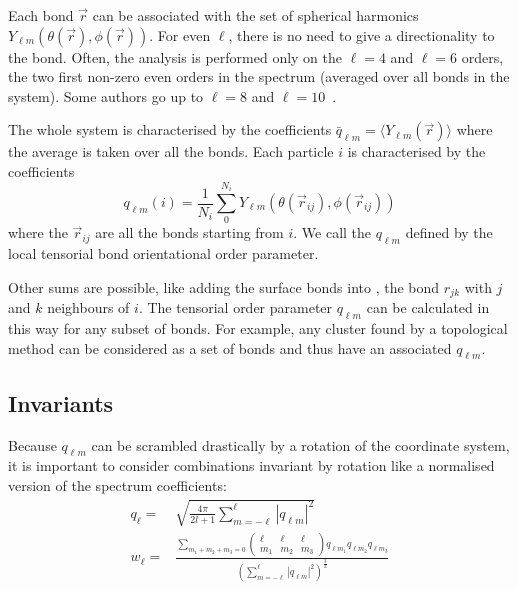 Each bond $\vec r$ can be associated with the set of spherical harmonics $Y_{\ell m}(\theta(\vec r),\phi(\vec r))$. For even $\ell$, there is no need to give a directionality to the bond. Often, the analysis is performed only on the $\ell=4$ and $\ell=6$ orders, the two first non-zero even orders in the spectrum (averaged over all bonds in the system). Some authors go up to $\ell=8$ and $\ell=10$~\citep{Chakravarty2002}.

The whole system is characterised by the coefficients $\bar{q}_{\ell m} = \langle Y_{\ell m}(\vec r) \rangle$ where the average is taken over all the bonds. Each particle $i$ is characterised by the coefficients
\begin{equation}
	q_{\ell m}(i) = \frac{1}{N_i}\sum_{0}^{N_i} Y_{\ell m}(\theta(\vec r_{ij}),\phi(\vec r_{ij}))
	\label{eq:qlm}
\end{equation}
where the $\vec{r}_{ij}$ are all the bonds starting from $i$. We call the $q_{\ell m}$ defined by  the local tensorial bond orientational order parameter.

Other sums are possible, like adding the surface bonds into ,  the bond $r_{jk}$ with $j$ and $k$ neighbours of $i$. The tensorial order parameter $q_{\ell m}$ can be calculated in this way for any subset of bonds. For example, any cluster found by a topological method can be considered as a set of bonds and thus have an associated $q_{\ell m}$.

\subsection{Invariants}
\label{sec:boo_invariants}
Because $q_{\ell m}$ can be scrambled drastically by a rotation of the coordinate system, it is important to consider combinations invariant by rotation like a normalised version of the spectrum coefficients:
\begin{align}
	q_\ell =& \sqrt{\frac{4\pi}{2l+1} \sum_{m=-\ell}^{\ell} |q_{\ell m}|^2 }\label{eq:ql}\\
	w_\ell =& \frac{
		\sum\limits_{m_1+m_2+m_3=0} 
			\left( \begin{array}{ccc}
				\ell & \ell & \ell \\
				m_1 & m_2 & m_3 
			\end{array} \right)
			q_{\ell m_1} q_{\ell m_2} q_{\ell m_3}
	}{
		\left(
			\sum\limits_{m=-\ell}^{\ell} |q_{\ell m}|^2
		\right)^{\frac{3}{2}}
	} \label{eq:wl}
\end{align}

